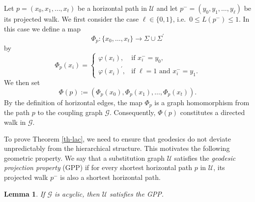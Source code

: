 \documentclass[reqno]{amsart}
\theoremstyle{plain}
\newtheorem{lemma}{Lemma}
\numberwithin{equation}{section}
\begin{document}
Let $p=(x_{0},x_{1},\dots ,x_{t})$ be a horizontal path in $\mathcal{U}$ and
let $p^{-}=(y_{0},y_{1},\dots ,y_{\ell })$ be its projected walk. We first
consider the case $\ell \in \{0,1\}$, i.e.\ $0\leq L(p^{-})\leq 1$. In this
case we define a map%
\begin{equation*}
\Phi _{p}:\{x_{0},\dots ,x_{t}\}\longrightarrow \Sigma \cup \Sigma ^{\prime }
\end{equation*}%
by 
\begin{equation*}
\Phi _{p}(x_{i})=%
\begin{cases}
\varphi (x_{i}), & \text{if }x_{i}^{-}=y_{0}, \\[0.3ex] 
\varphi (x_{i})^{\prime }, & \text{if }\ell =1\text{ and }x_{i}^{-}=y_{1}.%
\end{cases}%
\end{equation*}%
We then set 
\begin{equation*}
\Phi (p):=\left( \Phi _{p}(x_{0}),\Phi _{p}(x_{1}),\dots ,\Phi
_{p}(x_{t})\right) .
\end{equation*}%
By the definition of horizontal edges, the map $\Phi _{p}$ is a graph
homomorphism from the path $p$ to the coupling graph $\mathcal{G}$.
Consequently, $\Phi (p)$ constitutes a directed walk in $\mathcal{G}$.

To prove Theorem \ref{th-lac}, we need to ensure that geodesics do not
deviate unpredictably from the hierarchical structure. This motivates the
following geometric property. We say that a substitution graph $\mathcal{U}$
satisfies the \emph{geodesic projection property} (GPP) if for every
shortest horizontal path $p$ in $\mathcal{U}$, its projected walk $p^{-}$ is
also a shortest horizontal path.

\begin{lemma}
\label{le-GPP}If $\mathcal{G}$ is acyclic, then $\mathcal{U}$ satisfies the
GPP.
\end{lemma}
\end{document}
